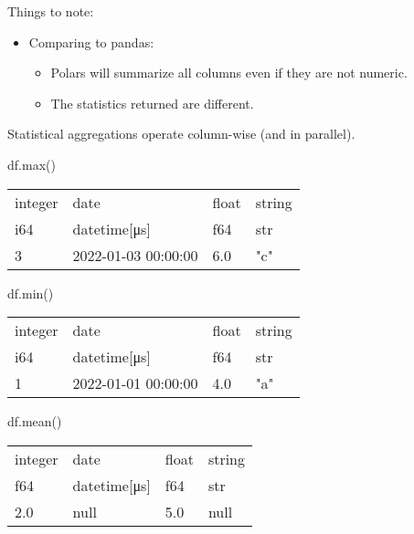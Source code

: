 \documentclass[
  letterpaper,
  DIV=11,
  numbers=noendperiod]{scrartcl}
\newenvironment{Shaded}{\begin{snugshade}}{\end{snugshade}}
\newcommand{\BuiltInTok}[1]{\textcolor[rgb]{0.00,0.23,0.31}{#1}}
\newcommand{\NormalTok}[1]{\textcolor[rgb]{0.00,0.23,0.31}{#1}}
\providecommand{\tightlist}{%
  \setlength{\itemsep}{0pt}\setlength{\parskip}{0pt}}\usepackage{longtable,booktabs,array}
\begin{document}
Things to note:

\begin{itemize}
\tightlist
\item
  Comparing to pandas:

  \begin{itemize}
  \tightlist
  \item
    Polars will summarize all columns even if they are not numeric.
  \item
    The statistics returned are different.
  \end{itemize}
\end{itemize}

Statistical aggregations operate column-wise (and in parallel).

\begin{Shaded}
\begin{Highlighting}[]
\NormalTok{df.}\BuiltInTok{max}\NormalTok{()}
\end{Highlighting}
\end{Shaded}

\begin{longtable}[]{@{}llll@{}}
\toprule()
integer & date & float & string \\
i64 & datetime{[}μs{]} & f64 & str \\
\midrule()
\endhead
3 & 2022-01-03 00:00:00 & 6.0 & "c" \\
\bottomrule()
\end{longtable}

\begin{Shaded}
\begin{Highlighting}[]
\NormalTok{df.}\BuiltInTok{min}\NormalTok{()}
\end{Highlighting}
\end{Shaded}

\begin{longtable}[]{@{}llll@{}}
\toprule()
integer & date & float & string \\
i64 & datetime{[}μs{]} & f64 & str \\
\midrule()
\endhead
1 & 2022-01-01 00:00:00 & 4.0 & "a" \\
\bottomrule()
\end{longtable}

\begin{Shaded}
\begin{Highlighting}[]
\NormalTok{df.mean()}
\end{Highlighting}
\end{Shaded}

\begin{longtable}[]{@{}llll@{}}
\toprule()
integer & date & float & string \\
f64 & datetime{[}μs{]} & f64 & str \\
\midrule()
\endhead
2.0 & null & 5.0 & null \\
\bottomrule()
\end{longtable}
\end{document}
